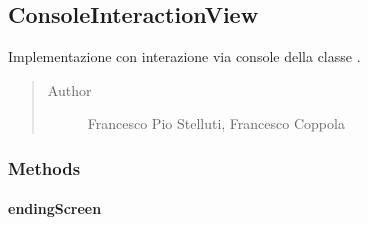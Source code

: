\documentclass[letterpaper,10pt,italian]{sphinxmanual}
\begin{document}
\subsection{ConsoleInteractionView}
\label{\detokenize{source/it/unicam/cs/pa/mastermind/ui/ConsoleInteractionView:consoleinteractionview}}\label{\detokenize{source/it/unicam/cs/pa/mastermind/ui/ConsoleInteractionView::doc}}

\begin{fulllineitems}
\label{\detokenize{source/it/unicam/cs/pa/mastermind/ui/ConsoleInteractionView:it.unicam.cs.pa.mastermind.ui.ConsoleInteractionView}}
Implementazione con interazione via console della classe .
\begin{quote}\begin{description}
\item[{Author}] \leavevmode
Francesco Pio Stelluti, Francesco Coppola

\end{description}\end{quote}

\end{fulllineitems}



\subsubsection{Methods}
\label{\detokenize{source/it/unicam/cs/pa/mastermind/ui/ConsoleInteractionView:methods}}

\paragraph{endingScreen}
\label{\detokenize{source/it/unicam/cs/pa/mastermind/ui/ConsoleInteractionView:endingscreen}}

\begin{fulllineitems}
\label{\detokenize{source/it/unicam/cs/pa/mastermind/ui/ConsoleInteractionView:it.unicam.cs.pa.mastermind.ui.ConsoleInteractionView.endingScreen(String)}}
\end{fulllineitems}
\end{document}
